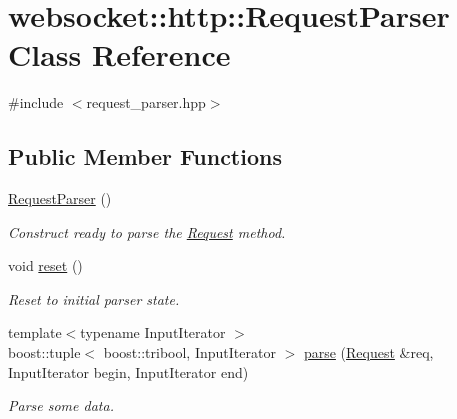 \hypertarget{classwebsocket_1_1http_1_1RequestParser}{}\section{websocket\+:\+:http\+:\+:Request\+Parser Class Reference}
\label{classwebsocket_1_1http_1_1RequestParser}


{\ttfamily \#include $<$request\+\_\+parser.\+hpp$>$}

\subsection*{Public Member Functions}
\begin{DoxyCompactItemize}
\item 
\hyperlink{classwebsocket_1_1http_1_1RequestParser_a0c02ad2192b73380e065c431ebaad15b}{Request\+Parser} ()
\begin{DoxyCompactList}\small\item\em Construct ready to parse the \hyperlink{structwebsocket_1_1http_1_1Request}{Request} method. \end{DoxyCompactList}\item 
void \hyperlink{classwebsocket_1_1http_1_1RequestParser_a32f5acf5850018f007a34a5357ca2dc9}{reset} ()
\begin{DoxyCompactList}\small\item\em Reset to initial parser state. \end{DoxyCompactList}\item 
{\footnotesize template$<$typename Input\+Iterator $>$ }\\boost\+::tuple$<$ boost\+::tribool, Input\+Iterator $>$ \hyperlink{classwebsocket_1_1http_1_1RequestParser_ae5dcbd6fc63f20cd9665163c6449f5a9}{parse} (\hyperlink{structwebsocket_1_1http_1_1Request}{Request} \&req, Input\+Iterator begin, Input\+Iterator end)
\begin{DoxyCompactList}\small\item\em Parse some data. \end{DoxyCompactList}\end{DoxyCompactItemize}
